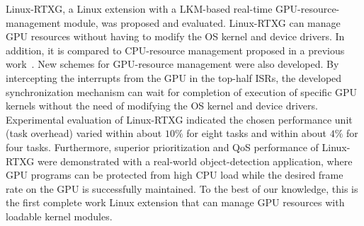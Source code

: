 Linux-RTXG, a Linux extension with a LKM-based real-time GPU-resource-management module, was proposed and evaluated.
Linux-RTXG can manage GPU resources without having to modify the OS kernel and device drivers.
In addition, it is compared to CPU-resource management proposed in a previous work~\cite{kato2009loadable, asberg2012exsched}.
New schemes for GPU-resource management were also developed.
By intercepting the interrupts from the GPU in the top-half ISRs, the developed synchronization mechanism can wait for completion of execution of specific GPU kernels without the need of modifying the OS kernel and device drivers.
Experimental evaluation of Linux-RTXG indicated the chosen performance unit (task overhead) varied within about $10\%$ for eight tasks and within about $4\%$ for four tasks.
Furthermore, superior prioritization and QoS performance of Linux-RTXG were demonstrated with a real-world object-detection application, where GPU programs can be protected from high CPU load while the desired frame rate on the GPU is successfully maintained.
To the best of our knowledge, this is the first complete work Linux extension that can manage GPU resources with loadable kernel modules.
